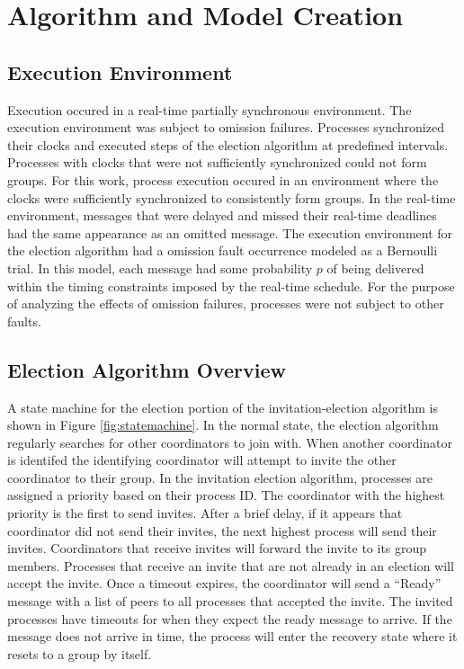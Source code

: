 \chapter{Algorithm and Model Creation}

\section{Execution Environment}

Execution occured in a real-time partially synchronous environment.
The execution environment was subject to omission failures.
Processes synchronized their clocks and executed steps of the election algorithm at predefined intervals.
Processes with clocks that were not sufficiently synchronized could not form groups.
For this work, process execution occured in an environment where the clocks were sufficiently synchronized to consistently form groups.
In the real-time environment, messages that were delayed and missed their real-time deadlines had the same appearance as an omitted message.
The execution environment for the election algorithm had a omission fault occurrence modeled as a Bernoulli trial.
In this model, each message had some probability $p$ of being delivered within the timing constraints imposed by the real-time schedule.
For the purpose of analyzing the effects of omission failures, processes were not subject to other faults.

\section{Election Algorithm Overview}

A state machine for the election portion of the invitation-election algorithm is shown in Figure \ref{fig:statemachine}.
In the normal state, the election algorithm regularly searches for other coordinators to join with.
When another coordinator is identifed the identifying coordinator will attempt to invite the other coordinator to their group.
In the invitation election algorithm, processes are assigned a priority based on their process ID.
The coordinator with the highest priority is the first to send invites.
After a brief delay, if it appears that coordinator did not send their invites, the next highest process will send their invites.
Coordinators that receive invites will forward the invite to its group members.
Processes that receive an invite that are not already in an election will accept the invite.
Once a timeout expires, the coordinator will send a ``Ready'' message with a list of peers to all processes that accepted the invite.
The invited processes have timeouts for when they expect the ready message to arrive.
If the message does not arrive in time, the process will enter the recovery state where it resets to a group by itself.


